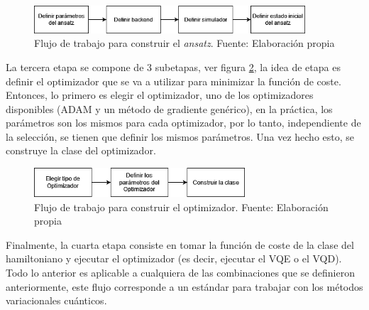 \begin{figure}[H]
\centering
\includegraphics[width=0.9\textwidth]{figures/S3/flujo2.png}
\caption{\label{fig:112} Flujo de trabajo para construir el \textit{ansatz}. Fuente: Elaboración propia}
\end{figure}

La tercera etapa se compone de 3 subetapas, ver figura \ref{fig:113}, la idea de etapa es definir el optimizador que se va a utilizar para minimizar la función de coste. Entonces, lo primero es elegir el optimizador, uno de los optimizadores disponibles (ADAM y un método de gradiente genérico), en la práctica, los parámetros son los mismos para cada optimizador, por lo tanto, independiente de la selección, se tienen que definir los mismos parámetros. Una vez hecho esto, se construye la clase del optimizador.

\begin{figure}[H]
\centering
\includegraphics[width=0.7\textwidth]{figures/S3/flujo3.png}
\caption{\label{fig:113} Flujo de trabajo para construir el optimizador. Fuente: Elaboración propia}
\end{figure}

Finalmente, la cuarta etapa consiste en tomar la función de coste de la clase del hamiltoniano y ejecutar el optimizador (es decir, ejecutar el VQE o el VQD). Todo lo anterior es aplicable a cualquiera de las combinaciones que se definieron anteriormente, este flujo corresponde a un estándar para trabajar con los métodos variacionales cuánticos.

